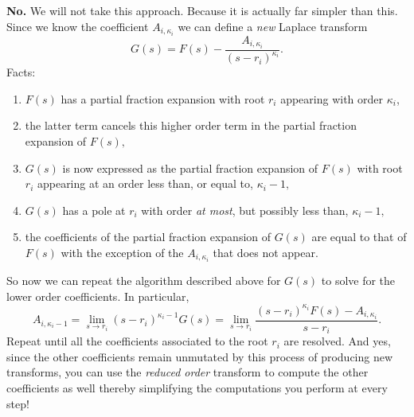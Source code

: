 \textbf{No.}
We will not take this approach.
Because it is actually far simpler than this.
Since we know the coefficient \(A_{i, \kappa_i}\) we can define a \emph{new} Laplace transform
\[
  G(s)
    = 
      F(s) - \frac{A_{i, \kappa_i}}{(s - r_i)^{\kappa_i}}.
\]
Facts:
\begin{enumerate}
  \item{\(F(s)\) has a partial fraction expansion with root \(r_i\) appearing with order \(\kappa_i\),}
  \item{the latter term cancels this higher order term in the partial fraction expansion of \(F(s),\)}
  \item{\(G(s)\) is now expressed as the partial fraction expansion of \(F(s)\) with root \(r_i\) appearing at an order less than, or equal to, \(\kappa_i - 1,\)}
  \item{\(G(s)\) has a pole at \(r_i\) with order \emph{at most}, but possibly less than, \(\kappa_i - 1,\)}
  \item{the coefficients of the partial fraction expansion of \(G(s)\) are equal to that of \(F(s)\) with the exception of the \(A_{i, \kappa_i}\) that does not appear.}
\end{enumerate}
So now we can repeat the algorithm described above for \(G(s)\) to solve for the lower order coefficients.
In particular,
\[
  A_{i, \kappa_i - 1}
    =
      \lim_{s \to r_i} (s - r_i)^{\kappa_i - 1} G(s)
    =
      \lim_{s \to r_i} \frac{(s - r_i)^{\kappa_i} F(s) - A_{i, \kappa_i}}{s - r_i}.
\]
Repeat until all the coefficients associated to the root \(r_i\) are resolved.
And yes, since the other coefficients remain unmutated by this process of producing new transforms, you can use the \emph{reduced order} transform to compute the other coefficients as well thereby simplifying the computations you perform at every step!

